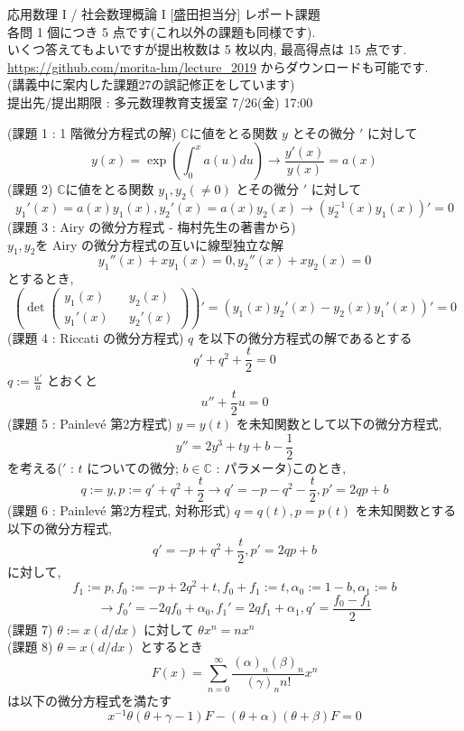 \documentclass{article}
\begin{document}
\begin{center}
  応用数理 I / 社会数理概論 I [盛田担当分] レポート課題\\
  各問 1 個につき 5 点です(これ以外の課題も同様です). \\
  いくつ答えてもよいですが提出枚数は 5 枚以内, 最高得点は 15 点です. \\
  \url{https://github.com/morita-hm/lecture_2019} からダウンロードも可能です.\\
  (講義中に案内した課題27の誤記修正をしています)\\
  提出先/提出期限 : 多元数理教育支援室 7/26(金) 17:00
\end{center}
(課題 1 : 1 階微分方程式の解) $\mathbb{C}$に値をとる関数 $y$ とその微分 $'$ に対して
\[ y(x) = \exp \left(\int^{x}_{0} a(u)du \right) \rightarrow \frac{y'(x)}{y(x)} = a(x) \]
(課題 2) $\mathbb{C}$に値をとる関数 $y_1, y_2 (\neq 0)$ とその微分 $'$ に対して
\[ y_1'(x) = a(x)y_1(x), y_2'(x) = a(x)y_2(x) \rightarrow (y_2^{-1}(x)y_1(x))' = 0 \]
(課題 3 : Airy の微分方程式 - 梅村先生の著書から) \\
$y_1,y_2$を Airy の微分方程式の互いに線型独立な解
\[ y_1''(x) + xy_1(x) = 0, y_2''(x) + xy_2(x) = 0 \]
とするとき,
\[ \left(\det
\begin{pmatrix}
  y_1(x)  && y_2(x) \\
  y_1'(x) && y_2'(x) 
\end{pmatrix}\right)' = (y_1(x)y_2'(x) - y_2(x)y_1'(x))' = 0 \]
(課題 4 : Riccati の微分方程式) $q$ を以下の微分方程式の解であるとする
\[ q' + q^2 + \frac{t}{2} = 0 \]
$q := \frac{u'}{u}$ とおくと
\[ u'' + \frac{t}{2} u = 0 \]
(課題 5 : Painlev\'e 第2方程式) $y=y(t)$ を未知関数として以下の微分方程式, 
\[ y'' = 2y^3 + ty + b - \frac{1}{2} \]
を考える($'$ : $t$ についての微分; $b \in \mathbb{C}$ : パラメータ)このとき,
\[q := y, p := q' + q^2 + \frac{t}{2} \rightarrow q' = -p - q^2 - \frac{t}{2}, p' = 2qp + b \]
(課題 6 : Painlev\'e 第2方程式, 対称形式) $q=q(t),p=p(t)$ を未知関数とする以下の微分方程式, 
\[ q' = -p + q^2 + \frac{t}{2}, p' = 2qp + b \]
に対して,
\[f_1 := p, f_0 := -p + 2q^2 + t, f_0 + f_1 := t, \alpha_0 := 1 - b, \alpha_1 := b \]
\[ \rightarrow f_0' = -2qf_0 + \alpha_0, f_1' = 2qf_1 + \alpha_1, q' = \frac{f_0 - f_1}{2} \]
\newpage \noindent
(課題 7) $\theta := x(d/dx)$ に対して $\theta x^n = n x^n$\\
(課題 8) $\theta = x(d/dx)$ とするとき
\[ F(x) = \sum^{\infty}_{n=0} \frac{(\alpha)_n(\beta)_n}{(\gamma)_n n!} x^n \]
は以下の微分方程式を満たす
\[ x^{-1}\theta(\theta + \gamma - 1)F - (\theta + \alpha)(\theta + \beta)F = 0\]
\end{document}
